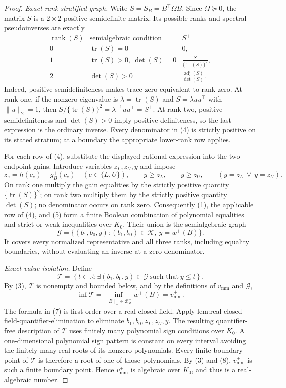 \documentclass{article}
\begin{document}
\begin{proof}
\emph{Exact rank-stratified graph.}
Write \(S=S_B=B^{\top}\Omega B\).  Since \(\Omega\succeq0\), the matrix \(S\) is a \(2\times2\) positive-semidefinite matrix.  Its possible ranks and spectral pseudoinverses are exactly
\[
\begin{array}{c|c|c}
\operatorname{rank}(S)&\text{semialgebraic condition}&S^+\\ \hline
0&\operatorname{tr}(S)=0&0,\\[2mm]
1&\operatorname{tr}(S)>0,\ \det(S)=0&
\displaystyle\frac{S}{\{\operatorname{tr}(S)\}^2},\\[3mm]
2&\det(S)>0&
\displaystyle\frac{\operatorname{adj}(S)}{\det(S)}.
\end{array}
\tag{4}
\]
Indeed, positive semidefiniteness makes trace zero equivalent to rank zero.  At rank one, if the nonzero eigenvalue is \(\lambda=\operatorname{tr}(S)\) and \(S=\lambda uu^{\top}\) with \(\lVert u\rVert_2=1\), then \(S/\{\operatorname{tr}(S)\}^2=\lambda^{-1}uu^{\top}=S^+\).  At rank two, positive semidefiniteness and \(\det(S)>0\) imply positive definiteness, so the last expression is the ordinary inverse.  Every denominator in (4) is strictly positive on its stated stratum; at a boundary the appropriate lower-rank row applies.

For each row of (4), substitute the displayed rational expression into the two endpoint gains.  Introduce variables \(z_L,z_U,y\) and impose
\[
z_e=h(c_e)-g_B^+(c_e)\quad(e\in\{L,U\}),
\qquad y\ge z_L,
\qquad y\ge z_U,
\qquad (y=z_L\ \vee\ y=z_U).
\tag{5}
\]
On rank one multiply the gain equalities by the strictly positive quantity \(\{\operatorname{tr}(S)\}^2\); on rank two multiply them by the strictly positive quantity \(\det(S)\); no denominator occurs on rank zero.  Consequently (1), the applicable row of (4), and (5) form a finite Boolean combination of polynomial equalities and strict or weak inequalities over \(K_0\).  Their union is the semialgebraic graph
\[
\mathcal G=
\{(b_1,b_0,y):(b_1,b_0)\in\mathcal K,\ y=w^+(B)\}.
\tag{6}
\]
It covers every normalized representative and all three ranks, including equality boundaries, without evaluating an inverse at a zero denominator.

\emph{Exact value isolation.}
Define
\[
\mathcal T=
\left\{t\in\mathbb R:
\exists(b_1,b_0,y)\in\mathcal G\ \text{such that}\ y\le t
\right\}.
\tag{7}
\]
By (3), \(\mathcal T\) is nonempty and bounded below, and by the definitions of \(v_{\mathrm{mm}}^+\) and \(\mathcal G\),
\[
\inf\mathcal T
=\inf_{[B]_+\in\mathcal B_Z^+}w^+(B)
=v_{\mathrm{mm}}^+.
\tag{8}
\]
The formula in (7) is first order over a real closed field.  Apply lem:real-closed-field-quantifier-elimination to eliminate \(b_1,b_0,z_L,z_U,y\).  The resulting quantifier-free description of \(\mathcal T\) uses finitely many polynomial sign conditions over \(K_0\).  A one-dimensional polynomial sign pattern is constant on every interval avoiding the finitely many real roots of its nonzero polynomials.  Every finite boundary point of \(\mathcal T\) is therefore a root of one of those polynomials.  By (3) and (8), \(v_{\mathrm{mm}}^+\) is such a finite boundary point.  Hence \(v_{\mathrm{mm}}^+\) is algebraic over \(K_0\), and thus is a real-algebraic number.


\end{proof}
\end{document}
